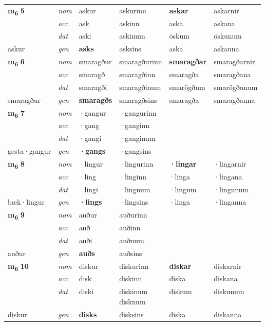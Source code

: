 \begin{longtable}[l]{X>{\footnotesize\itshape}XXXXX}
\multirow{3}{*}{{{\textbf{m{\textsubscript{6}}} \Large{\textbf{5}}}}} & nom & askur & askurinn & \textbf{askar} & askarnir \\*
 & acc & ask & askinn & aska & askana \\*
 & dat & aski & askinum & öskum & öskunum \\*
 {\footnotesize{askur}} & gen & \textbf{asks} & asksins & aska & askanna \\
\cmidrule{1-6}

\multirow{3}{*}{{{\textbf{m{\textsubscript{6}}} \Large{\textbf{6}}}}} & nom & smaragður & smaragðurinn & \textbf{smaragðar} & smaragðarnir \\*
 & acc & smaragð & smaragðinn & smaragða & smaragðana \\*
 & dat & smaragði & smaragðinum & smarögðum & smarögðunum \\*
 {\footnotesize{smaragður}} & gen & \textbf{smaragðs} & smaragðsins & smaragða & smaragðanna \\
\cmidrule{1-6}

\multirow{3}{*}{{{\textbf{m{\textsubscript{6}}} \Large{\textbf{7}}}}} & nom & ·gangur & ·gangurinn & \textbf{} &  \\*
 & acc & ·gang & ·ganginn &  &  \\*
 & dat & ·gangi & ·ganginum &  &  \\*
 {\footnotesize{gesta\allowbreak ·gangur}} & gen & \textbf{·gangs} & ·gangsins &  &  \\
\cmidrule{1-6}

\multirow{3}{*}{{{\textbf{m{\textsubscript{6}}} \Large{\textbf{8}}}}} & nom & ·lingur & ·lingurinn & \textbf{·lingar} & ·lingarnir \\*
 & acc & ·ling & ·linginn & ·linga & ·lingana \\*
 & dat & ·lingi & ·lingnum & ·lingum & ·lingunum \\*
 {\footnotesize{bæk\allowbreak ·lingur}} & gen & \textbf{·lings} & ·lingsins & ·linga & ·linganna \\
\cmidrule{1-6}

\multirow{3}{*}{{{\textbf{m{\textsubscript{6}}} \Large{\textbf{9}}}}} & nom & auður & auðurinn & \textbf{} &  \\*
 & acc & auð & auðinn &  &  \\*
 & dat & auði & auðnum &  &  \\*
 {\footnotesize{auður}} & gen & \textbf{auðs} & auðsins &  &  \\
\cmidrule{1-6}

\multirow{3}{*}{{{\textbf{m{\textsubscript{6}}} \Large{\textbf{10}}}}} & nom & diskur & diskurinn & \textbf{diskar} & diskarnir \\*
 & acc & disk & diskinn & diska & diskana \\*
 & dat & diski & \specialcell{diskinum\\ disknum} & diskum & diskunum \\*
 {\footnotesize{diskur}} & gen & \textbf{disks} & disksins & diska & diskanna \\
\cmidrule{1-6}


\end{longtable}
